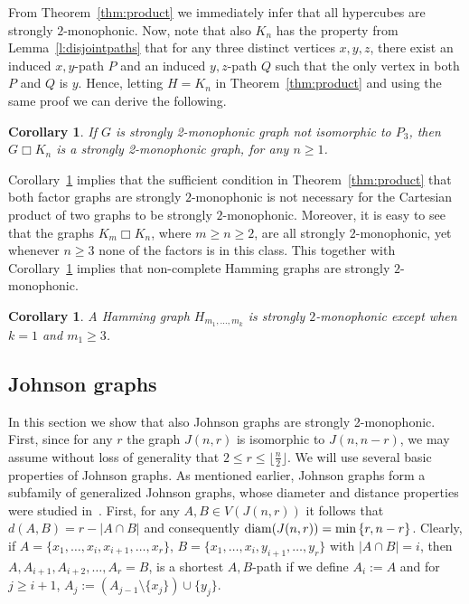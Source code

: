 \documentclass[a4paper,11pt]{article}
\newtheorem{corollary}[theorem]{Corollary}
\begin{document}
 From Theorem~\ref{thm:product} we immediately infer that all hypercubes are strongly $2$-monophonic.
Now, note that also $K_n$ has the property from Lemma~\ref{l:disjointpaths} that for any three distinct vertices $x,y,z$, there exist an induced $x,y$-path $P$ and an induced $y,z$-path $Q$ such that the only vertex in both $P$ and $Q$ is $y$. Hence, letting $H=K_n$ in Theorem~\ref{thm:product} and using the same proof we can derive the following.

\begin{corollary}\label{c:productComplete}
    If $G$ is strongly 2-monophonic graph not isomorphic to $P_3$, then $G \Box K_n$ is a strongly 2-monophonic graph, for any $n\geq 1$.
\end{corollary}

Corollary~\ref{c:productComplete} implies that the sufficient condition in Theorem~\ref{thm:product} that both factor graphs are strongly $2$-monophonic is not necessary for the Cartesian product of two graphs to be strongly $2$-monophonic. Moreover, it is easy to see that the graphs $K_m\Box K_n$, where $m\ge n\ge 2$, are all strongly $2$-monophonic, yet whenever $n\ge 3$ none of the factors is in this class. This together with Corollary~\ref{c:productComplete} implies that non-complete Hamming graphs are strongly $2$-monophonic.

\begin{corollary}\label{cor:hypercubes-S2M}
A Hamming graph $H_{m_1,\ldots,m_k}$  is strongly $2$-monophonic except when $k=1$ and $m_1\ge 3$.
\end{corollary}


\subsection{Johnson graphs}

In this section we show that also Johnson graphs are strongly 2-monophonic. First, since for any $r$ the graph $J(n,r)$ is isomorphic to $J(n,n-r)$, we may assume without loss of generality that $2 \leq r \leq \lfloor \frac{n}{2} \rfloor$. We will use several basic properties of Johnson graphs. 
As mentioned earlier, Johnson graphs form a subfamily of generalized Johnson graphs, whose diameter and distance properties were studied in~\cite{agong2028diameter}.
First, for any $A,B \in V(J(n,r))$ it follows that $d(A,B)=r-|A \cap B|$ and consequently ${\rm diam}(J(n,r))=\min{\{r,n-r\}}$. Clearly, if $A=\{x_1,\ldots ,x_i,x_{i+1},\ldots , x_r\}$, $B=\{x_1,\ldots ,x_i,y_{i+1},\ldots ,y_r\}$ with $|A \cap B|= i$, then $A, A_{i+1},A_{i+2},\ldots , A_r=B$, is a shortest $A,B$-path if we define $A_i:=A$ and for $j \geq i+1$, $A_{j}:=(A_{j-1}\setminus \{x_{j}\}) \cup \{y_j\}$.
\end{document}
